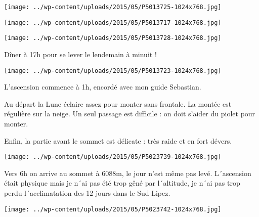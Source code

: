  

 

\begin{center} \texttt{[image: ../wp-content/uploads/2015/05/P5013725-1024x768.jpg]} \end{center}

 

 

\begin{center} \texttt{[image: ../wp-content/uploads/2015/05/P5013717-1024x768.jpg]} \end{center}

 

 

\begin{center} \texttt{[image: ../wp-content/uploads/2015/05/P5013728-1024x768.jpg]} \end{center}

 

 Dîner à 17h pour se lever le lendemain à minuit ! 

 

\begin{center} \texttt{[image: ../wp-content/uploads/2015/05/P5013723-1024x768.jpg]} \end{center}

 

 L'ascension commence à 1h, encordé avec mon guide Sebastian. 

 Au départ la Lune éclaire assez pour monter sans frontale. La montée est régulière sur la neige. Un seul passage est difficile : on doit s'aider du piolet pour monter. 

 Enfin, la partie avant le sommet est délicate : très raide et en fort dévers. 

 

\begin{center} \texttt{[image: ../wp-content/uploads/2015/05/P5023739-1024x768.jpg]} \end{center}

 

 Vers 6h on arrive au sommet à 6088m, le jour n'est même pas levé. L´ascension était physique mais je n´ai pas été trop gêné par l´altitude, je n´ai pas trop perdu l´acclimatation des 12 jours dans le Sud Lipez. 

 

\begin{center} \texttt{[image: ../wp-content/uploads/2015/05/P5023742-1024x768.jpg]} \end{center}

